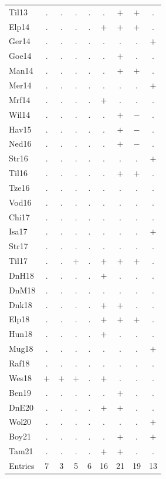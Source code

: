 {\begin{longtable}{@{}lcccccccc@{}}
Til13 & . & . & . & . & . & $+$ & $+$ & . \\
Elp14 & . & . & . & . & $+$ & $+$ & $+$ & . \\
Ger14 & . & . & . & . & . & . & . & $+$ \\
Goe14 & . & . & . & . & . & $+$ & . & . \\
Man14 & . & . & . & . & . & $+$ & $+$ & . \\
Mer14 & . & . & . & . & . & . & . & $+$ \\
Mrf14 & . & . & . & . & $+$ & . & . & . \\
Wil14 & . & . & . & . & . & $+$ & $-$ & . \\
Hav15 & . & . & . & . & . & $+$ & $-$ & . \\
Ned16 & . & . & . & . & . & $+$ & $-$ & . \\
Str16 & . & . & . & . & . & . & . & $+$ \\
Til16 & . & . & . & . & . & $+$ & $+$ & . \\
Tze16 & . & . & . & . & . & . & . & . \\
Vod16 & . & . & . & . & . & . & . & . \\
Chi17 & . & . & . & . & . & . & . & . \\
Isa17 & . & . & . & . & . & . & . & $+$ \\
Str17 & . & . & . & . & . & . & . & . \\
Til17 & . & . & $+$ & . & $+$ & $+$ & $+$ & . \\
DnH18 & . & . & . & . & $+$ & . & . & . \\
DnM18 & . & . & . & . & . & . & . & . \\
Dnk18 & . & . & . & . & $+$ & $+$ & . & . \\
Elp18 & . & . & . & . & $+$ & $+$ & $+$ & . \\
Hun18 & . & . & . & . & $+$ & . & . & . \\
Mug18 & . & . & . & . & . & . & . & $+$ \\
Raf18 & . & . & . & . & . & . & . & . \\
Wes18 & $+$ & $+$ & $+$ & . & $+$ & . & . & . \\
Ben19 & . & . & . & . & . & $+$ & . & . \\
DnE20 & . & . & . & . & $+$ & $+$ & . & . \\
Wol20 & . & . & . & . & . & . & . & $+$ \\
Boy21 & . & . & . & . & . & $+$ & . & $+$ \\
Tam21 & . & . & . & . & $+$ & $+$ & . & . \\
\midrule Entries & 7 & 3 & 5 & 6 & 16 & 21 & 19 & 13 \\
\end{longtable}}
